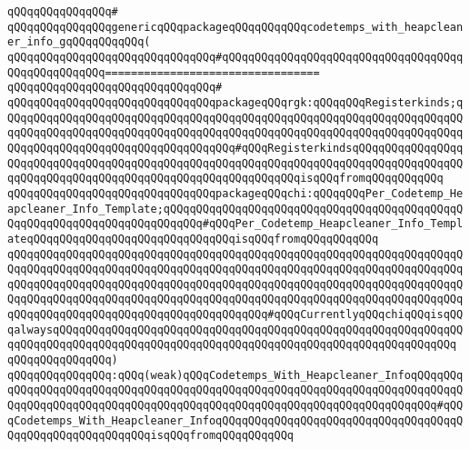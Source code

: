 \verb|qQQqqQQqqQQqqQQq#|\newline
\verb|qQQqqQQqqQQqqQQqgenericqQQqpackageqQQqqQQqqQQqcodetemps_with_heapcleaner_info_gqQQqqQQqqQQq(|\newline
\verb|qQQqqQQqqQQqqQQqqQQqqQQqqQQqqQQq#qQQqqQQqqQQqqQQqqQQqqQQqqQQqqQQqqQQqqQQqqQQqqQQqqQQq=================================|\newline
\verb|qQQqqQQqqQQqqQQqqQQqqQQqqQQqqQQq#|\newline
\verb|qQQqqQQqqQQqqQQqqQQqqQQqqQQqqQQqpackageqQQqrgk:qQQqqQQqRegisterkinds;qQQqqQQqqQQqqQQqqQQqqQQqqQQqqQQqqQQqqQQqqQQqqQQqqQQqqQQqqQQqqQQqqQQqqQQqqQQqqQQqqQQqqQQqqQQqqQQqqQQqqQQqqQQqqQQqqQQqqQQqqQQqqQQqqQQqqQQqqQQqqQQqqQQqqQQqqQQqqQQqqQQqqQQqqQQqqQQq#qQQqRegisterkindsqQQqqQQqqQQqqQQqqQQqqQQqqQQqqQQqqQQqqQQqqQQqqQQqqQQqqQQqqQQqqQQqqQQqqQQqqQQqqQQqqQQqqQQqqQQqqQQqqQQqqQQqqQQqqQQqqQQqqQQqqQQqqQQqqQQqisqQQqfromqQQqqQQqqQQq|\newline
\verb|qQQqqQQqqQQqqQQqqQQqqQQqqQQqqQQqpackageqQQqchi:qQQqqQQqPer_Codetemp_Heapcleaner_Info_Template;qQQqqQQqqQQqqQQqqQQqqQQqqQQqqQQqqQQqqQQqqQQqqQQqqQQqqQQqqQQqqQQqqQQqqQQqqQQq#qQQqPer_Codetemp_Heapcleaner_Info_TemplateqQQqqQQqqQQqqQQqqQQqqQQqqQQqqQQqisqQQqfromqQQqqQQqqQQq|\newline
\verb|qQQqqQQqqQQqqQQqqQQqqQQqqQQqqQQqqQQqqQQqqQQqqQQqqQQqqQQqqQQqqQQqqQQqqQQqqQQqqQQqqQQqqQQqqQQqqQQqqQQqqQQqqQQqqQQqqQQqqQQqqQQqqQQqqQQqqQQqqQQqqQQqqQQqqQQqqQQqqQQqqQQqqQQqqQQqqQQqqQQqqQQqqQQqqQQqqQQqqQQqqQQqqQQqqQQqqQQqqQQqqQQqqQQqqQQqqQQqqQQqqQQqqQQqqQQqqQQqqQQqqQQqqQQqqQQqqQQqqQQqqQQqqQQqqQQqqQQqqQQqqQQqqQQqqQQqqQQqqQQq#qQQqCurrentlyqQQqchiqQQqisqQQqalwaysqQQqqQQqqQQqqQQqqQQqqQQqqQQqqQQqqQQqqQQqqQQqqQQqqQQqqQQqqQQqqQQqqQQqqQQqqQQqqQQqqQQqqQQqqQQqqQQqqQQqqQQqqQQqqQQqqQQqqQQqqQQqqQQqqQQq|\newline
\verb|qQQqqQQqqQQqqQQq)|\newline
\verb|qQQqqQQqqQQqqQQq:qQQq(weak)qQQqCodetemps_With_Heapcleaner_InfoqQQqqQQqqQQqqQQqqQQqqQQqqQQqqQQqqQQqqQQqqQQqqQQqqQQqqQQqqQQqqQQqqQQqqQQqqQQqqQQqqQQqqQQqqQQqqQQqqQQqqQQqqQQqqQQqqQQqqQQqqQQqqQQqqQQqqQQqqQQqqQQq#qQQqCodetemps_With_Heapcleaner_InfoqQQqqQQqqQQqqQQqqQQqqQQqqQQqqQQqqQQqqQQqqQQqqQQqqQQqqQQqqQQqisqQQqfromqQQqqQQqqQQq|\newline
